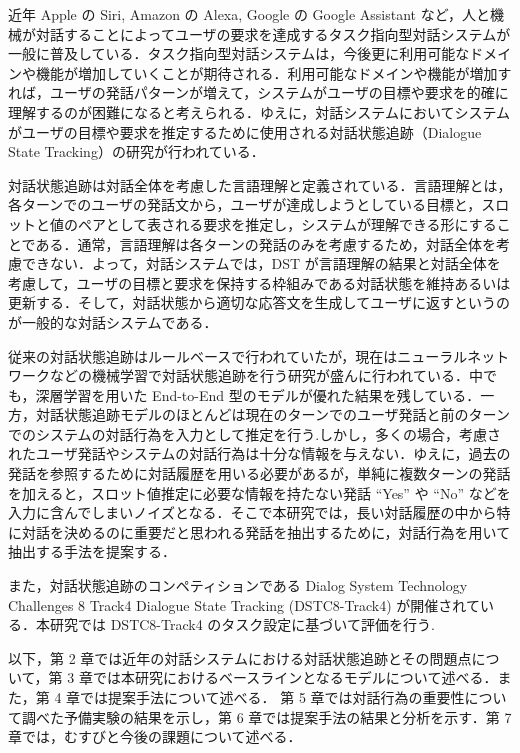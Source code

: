 近年 Apple の Siri, Amazon の Alexa, Google の Google Assistant など，人と機械が対話することによってユーザの要求を達成するタスク指向型対話システムが一般に普及している．タスク指向型対話システムは，今後更に利用可能なドメインや機能が増加していくことが期待される．利用可能なドメインや機能が増加すれば，ユーザの発話パターンが増えて，システムがユーザの目標や要求を的確に理解するのが困難になると考えられる．ゆえに，対話システムにおいてシステムがユーザの目標や要求を推定するために使用される対話状態追跡（Dialogue State Tracking）の研究が行われている．\par
対話状態追跡は対話全体を考慮した言語理解と定義されている．言語理解とは，各ターンでのユーザの発話文から，ユーザが達成しようとしている目標と，スロットと値のペアとして表される要求を推定し，システムが理解できる形にすることである．通常，言語理解は各ターンの発話のみを考慮するため，対話全体を考慮できない．よって，対話システムでは，DST が言語理解の結果と対話全体を考慮して，ユーザの目標と要求を保持する枠組みである対話状態を維持あるいは更新する．そして，対話状態から適切な応答文を生成してユーザに返すというのが一般的な対話システムである．\par
従来の対話状態追跡はルールベースで行われていたが，現在はニューラルネットワークなどの機械学習で対話状態追跡を行う研究が盛んに行われている．中でも，深層学習を用いた End-to-End 型のモデル\cite{nbt,e2e}が優れた結果を残している．一方，対話状態追跡モデルのほとんどは現在のターンでのユーザ発話と前のターンでのシステムの対話行為を入力として推定を行う.しかし，多くの場合，考慮されたユーザ発話やシステムの対話行為は十分な情報を与えない．ゆえに，過去の発話を参照するために対話履歴を用いる必要があるが，単純に複数ターンの発話を加えると，スロット値推定に必要な情報を持たない発話 “Yes” や “No” などを入力に含んでしまいノイズとなる．そこで本研究では，長い対話履歴の中から特に対話を決めるのに重要だと思われる発話を抽出するために，対話行為を用いて抽出する手法を提案する．\par
また，対話状態追跡のコンペティションである  Dialog System Technology Challenges 8 Track4 Dialogue State Tracking (DSTC8-Track4)\cite{dstc8} が開催されている．本研究では DSTC8-Track4 のタスク設定に基づいて評価を行う.\par
以下，第 2 章では近年の対話システムにおける対話状態追跡とその問題点について，第 3 章では本研究におけるベースラインとなるモデルについて述べる．また，第 4 章では提案手法について述べる．
第 5 章では対話行為の重要性について調べた予備実験の結果を示し，第 6 章では提案手法の結果と分析を示す．第 7 章では，むすびと今後の課題について述べる．
